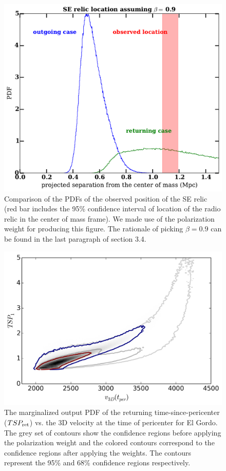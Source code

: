 \documentclass[letterpaper,useAMS,usenatbib]{mn2e}
\begin{document}
\begin{figure}
	\includegraphics[width=\linewidth]{our_guess_SE.pdf}
	\caption{Comparison of the PDFs of the observed position of the SE relic (red bar
	includes the 95\% confidence interval of location of the radio relic in
the center of mass frame). We made use of the polarization weight for
producing this figure. The
rationale of picking $\beta = 0.9$ can be found in the last paragraph of
section 3.4. 
}
	\label{fig:our_guessed_scenario1}
\end{figure}
\begin{figure}
	\includegraphics[width=\linewidth]{TwoMnWBSG_2contour2d.png}
	\caption{The marginalized output PDF of the returning time-since-pericenter
($TSP_{\rm ret}$) vs. the 3D velocity at the time of pericenter for El Gordo. The
grey set of contours show the confidence regions before applying the
polarization weight and the colored contours correspond to the confidence
regions after applying the weights. The contours represent the 95\% and
68\% confidence regions respectively. }
	\label{fig:TSP_v3D}
\end{figure}
\end{document}
